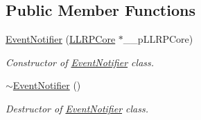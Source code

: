 \subsection*{Public Member Functions}
\begin{DoxyCompactItemize}
\item 
\hyperlink{class_e_l_f_i_n_1_1_event_notifier_a8dbb404de4d2428b4d1c56c941318d27}{Event\-Notifier} (\hyperlink{class_e_l_f_i_n_1_1_l_l_r_p_core}{L\-L\-R\-P\-Core} $\ast$\-\_\-\-\_\-p\-L\-L\-R\-P\-Core)
\begin{DoxyCompactList}\small\item\em Constructor of \hyperlink{class_e_l_f_i_n_1_1_event_notifier}{Event\-Notifier} class. \end{DoxyCompactList}\item 
\hyperlink{class_e_l_f_i_n_1_1_event_notifier_a04ffb92dce7ddb26097dcce5546c9aae}{$\sim$\-Event\-Notifier} ()
\begin{DoxyCompactList}\small\item\em Destructor of \hyperlink{class_e_l_f_i_n_1_1_event_notifier}{Event\-Notifier} class. \end{DoxyCompactList}\end{DoxyCompactItemize}
{\bf }\par
